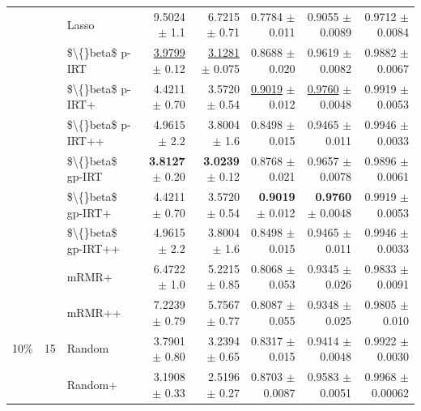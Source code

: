 \begin{longtable}{llp{}rrrrr}
 &  & Lasso & 9.5024 {\scriptsize $\pm$ 1.1} & 6.7215 {\scriptsize $\pm$ 0.71} & 0.7784 {\scriptsize $\pm$ 0.011} & 0.9055 {\scriptsize $\pm$ 0.0089} & 0.9712 {\scriptsize $\pm$ 0.0084} \\
 &  & \$\textbackslash\{\}beta\$ p-IRT & \underline{3.9799} {\scriptsize $\pm$ 0.12} & \underline{3.1281} {\scriptsize $\pm$ 0.075} & 0.8688 {\scriptsize $\pm$ 0.020} & 0.9619 {\scriptsize $\pm$ 0.0082} & 0.9882 {\scriptsize $\pm$ 0.0067} \\
 &  & \$\textbackslash\{\}beta\$ p-IRT+ & 4.4211 {\scriptsize $\pm$ 0.70} & 3.5720 {\scriptsize $\pm$ 0.54} & \underline{0.9019} {\scriptsize $\pm$ 0.012} & \underline{0.9760} {\scriptsize $\pm$ 0.0048} & 0.9919 {\scriptsize $\pm$ 0.0053} \\
 &  & \$\textbackslash\{\}beta\$ p-IRT++ & 4.9615 {\scriptsize $\pm$ 2.2} & 3.8004 {\scriptsize $\pm$ 1.6} & 0.8498 {\scriptsize $\pm$ 0.015} & 0.9465 {\scriptsize $\pm$ 0.011} & 0.9946 {\scriptsize $\pm$ 0.0033} \\
 &  & \$\textbackslash\{\}beta\$ gp-IRT & \textbf{3.8127} {\scriptsize $\pm$ 0.20} & \textbf{3.0239} {\scriptsize $\pm$ 0.12} & 0.8768 {\scriptsize $\pm$ 0.021} & 0.9657 {\scriptsize $\pm$ 0.0078} & 0.9896 {\scriptsize $\pm$ 0.0061} \\
 &  & \$\textbackslash\{\}beta\$ gp-IRT+ & 4.4211 {\scriptsize $\pm$ 0.70} & 3.5720 {\scriptsize $\pm$ 0.54} & \textbf{0.9019} {\scriptsize $\pm$ 0.012} & \textbf{0.9760} {\scriptsize $\pm$ 0.0048} & 0.9919 {\scriptsize $\pm$ 0.0053} \\
 &  & \$\textbackslash\{\}beta\$ gp-IRT++ & 4.9615 {\scriptsize $\pm$ 2.2} & 3.8004 {\scriptsize $\pm$ 1.6} & 0.8498 {\scriptsize $\pm$ 0.015} & 0.9465 {\scriptsize $\pm$ 0.011} & 0.9946 {\scriptsize $\pm$ 0.0033} \\
 &  & mRMR+ & 6.4722 {\scriptsize $\pm$ 1.0} & 5.2215 {\scriptsize $\pm$ 0.85} & 0.8068 {\scriptsize $\pm$ 0.053} & 0.9345 {\scriptsize $\pm$ 0.026} & 0.9833 {\scriptsize $\pm$ 0.0091} \\
 &  & mRMR++ & 7.2239 {\scriptsize $\pm$ 0.79} & 5.7567 {\scriptsize $\pm$ 0.77} & 0.8087 {\scriptsize $\pm$ 0.055} & 0.9348 {\scriptsize $\pm$ 0.025} & 0.9805 {\scriptsize $\pm$ 0.010} \\
\midrule
10\% & 15 & Random & 3.7901 {\scriptsize $\pm$ 0.80} & 3.2394 {\scriptsize $\pm$ 0.65} & 0.8317 {\scriptsize $\pm$ 0.015} & 0.9414 {\scriptsize $\pm$ 0.0048} & 0.9922 {\scriptsize $\pm$ 0.0030} \\
 &  & Random+ & 3.1908 {\scriptsize $\pm$ 0.33} & 2.5196 {\scriptsize $\pm$ 0.27} & 0.8703 {\scriptsize $\pm$ 0.0087} & 0.9583 {\scriptsize $\pm$ 0.0051} & 0.9968 {\scriptsize $\pm$ 0.00062} \\

\end{longtable}
